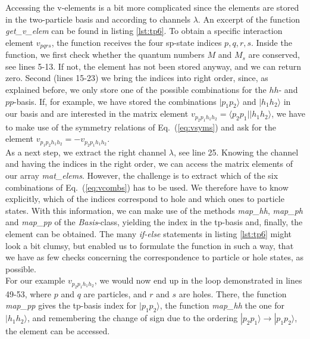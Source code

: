 Accessing the v-elements is a bit more complicated since the elements are stored in the \mbox{two-particle} basis and according to channels $\lambda$. An excerpt of the function \textit{get\_v\_elem} can be found in listing \ref{lst:tp6}. 
To obtain a specific interaction element $v_{pqrs}$, the function
receives the four sp-state indices $p,q,r,s$. Inside the function, we first check whether the quantum numbers $M$ and $M_s$ are conserved, see lines 5-13. If not, the element has not been stored anyway, and we can return zero. Second (lines 15-23) we bring the indices into right order, since, as explained before, we only store one of the possible combinations for the $hh$- and $pp$-basis. If, for example, we have stored the combinations $|p_1 p_2\rangle$ and $| h_1 h_2 \rangle$ in our basis and are interested in the matrix element $v_{p_{2} p_1 h_1 h_2} = \langle p_2 p_1 | | h_1 h_2 \rangle$, we have to make use of the symmetry relations of Eq.~(\ref{eq:vsyms}) and ask for the element $v_{p_1 p_2 h_1 h_2}= - v_{p_2 p_1 h_1 h_2}$. \\
As a next step, we extract the right channel $\lambda$, see line 25. Knowing the channel and having the indices in the right order, we can access the matrix elements of our array \textit{mat\_elems}. However, the challenge is to extract which of the six combinations of Eq.~(\ref{eq:vcombs}) has to be used.  We therefore have to know explicitly, which of the indices correspond to hole and which ones to particle states. With this information, we can make use of the methods \textit{map\_hh}, \textit{map\_ph} and \textit{map\_pp} of the \textit{Basis}-class, yielding the index in the tp-basis and, finally, the element can be obtained. The many \textit{if-else} statements in listing \ref{lst:tp6} might look a bit clumsy, but enabled us to formulate the function in such a way, that we have as few checks concerning the correspondence to particle or hole states, as possible.\\
For our example $v_{p_2 p_1 h_1 h_2}$, we would now end up in the loop demonstrated in lines 49-53, where $p$ and $q$ are particles, and $r$ and $s$ are holes. There, the function \textit{map\_pp} gives the tp-basis index for $|p_1 p_2\rangle$, the function \textit{map\_hh} the one for $| h_1 h_2 \rangle$, and remembering the change of sign due to the ordering $|p_2 p_1\rangle \rightarrow |p_1 p_2\rangle$, the element can be accessed.

